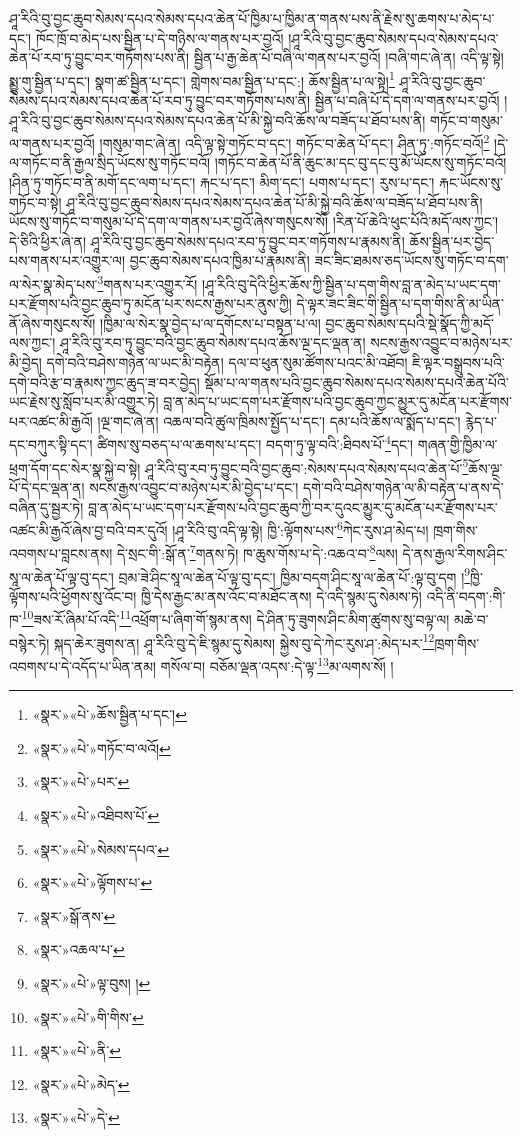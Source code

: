 ཤཱ་རིའི་བུ་བྱང་ཆུབ་སེམས་དཔའ་སེམས་དཔའ་ཆེན་པོ་ཁྱིམ་པ་ཁྱིམ་ན་གནས་པས་ནི་རྗེས་སུ་ཆགས་པ་མེད་པ་དང་། ཁོང་ཁྲོ་བ་མེད་པས་སྦྱིན་པ་དེ་གཉིས་ལ་གནས་པར་བྱའོ། །ཤཱ་རིའི་བུ་བྱང་ཆུབ་སེམས་དཔའ་སེམས་དཔའ་ཆེན་པོ་རབ་ཏུ་བྱུང་བར་གཏོགས་པས་ནི། སྦྱིན་པ་རྒྱ་ཆེན་པོ་བཞི་ལ་གནས་པར་བྱའོ། །བཞི་གང་ཞེ་ན། འདི་ལྟ་སྟེ། སྨྱུ་གུ་སྦྱིན་པ་དང་། སྣག་ཚ་སྦྱིན་པ་དང་། གླེགས་བམ་སྦྱིན་པ་དང་:། ཆོས་སྦྱིན་པ་ལ་སྟེ།\footnote{«སྣར་»«པེ་»ཆོས་སྦྱིན་པ་དང་།} ཤཱ་རིའི་བུ་བྱང་ཆུབ་སེམས་དཔའ་སེམས་དཔའ་ཆེན་པོ་རབ་ཏུ་བྱུང་བར་གཏོགས་པས་ནི། སྦྱིན་པ་བཞི་པོ་དེ་དག་ལ་གནས་པར་བྱའོ། །ཤཱ་རིའི་བུ་བྱང་ཆུབ་སེམས་དཔའ་སེམས་དཔའ་ཆེན་པོ་མི་སྐྱེ་བའི་ཆོས་ལ་བཟོད་པ་ཐོབ་པས་ནི། གཏོང་བ་གསུམ་ལ་གནས་པར་བྱའོ། །གསུམ་གང་ཞེ་ན། འདི་ལྟ་སྟེ་གཏོང་བ་དང་། གཏོང་བ་ཆེན་པོ་དང་། ཤིན་ཏུ་:གཏོང་བའོ།\footnote{«སྣར་»«པེ་»གཏོང་བ་ལའོ།} །དེ་ལ་གཏོང་བ་ནི་རྒྱལ་སྲིད་ཡོངས་སུ་གཏོང་བའོ། །གཏོང་བ་ཆེན་པོ་ནི་ཆུང་མ་དང་བུ་དང་བུ་མོ་ཡོངས་སུ་གཏོང་བའོ། །ཤིན་ཏུ་གཏོང་བ་ནི་མགོ་དང་ལག་པ་དང་། རྐང་པ་དང་། མིག་དང་། པགས་པ་དང་། རུས་པ་དང་། རྐང་ཡོངས་སུ་གཏོང་བ་སྟེ། ཤཱ་རིའི་བུ་བྱང་ཆུབ་སེམས་དཔའ་སེམས་དཔའ་ཆེན་པོ་མི་སྐྱེ་བའི་ཆོས་ལ་བཟོད་པ་ཐོབ་པས་ནི། ཡོངས་སུ་གཏོང་བ་གསུམ་པོ་དེ་དག་ལ་གནས་པར་བྱའོ་ཞེས་གསུངས་སོ། །རིན་པོ་ཆེའི་ཕུང་པོའི་མདོ་ལས་ཀྱང་། དེ་ཅིའི་ཕྱིར་ཞེ་ན། ཤཱ་རིའི་བུ་བྱང་ཆུབ་སེམས་དཔའ་རབ་ཏུ་བྱུང་བར་གཏོགས་པ་རྣམས་ནི། ཆོས་སྦྱིན་པར་བྱེད་པས་གནས་པར་འགྱུར་ལ། བྱང་ཆུབ་སེམས་དཔའ་ཁྱིམ་པ་རྣམས་ནི། ཟང་ཟིང་ཐམས་ཅད་ཡོངས་སུ་གཏོང་བ་དག་ལ་སེར་སྣ་མེད་པས་\footnote{«སྣར་»«པེ་»པར་}གནས་པར་འགྱུར་རོ། །ཤཱ་རིའི་བུ་དེའི་ཕྱིར་ཆོས་ཀྱི་སྦྱིན་པ་དག་གིས་བླ་ན་མེད་པ་ཡང་དག་པར་རྫོགས་པའི་བྱང་ཆུབ་ཏུ་མངོན་པར་སངས་རྒྱས་པར་ནུས་ཀྱི། དེ་ལྟར་ཟང་ཟིང་གི་སྦྱིན་པ་དག་གིས་ནི་མ་ཡིན་ནོ་ཞེས་གསུངས་སོ། །ཁྱིམ་ལ་སེར་སྣ་བྱེད་པ་ལ་དགོངས་པ་བསྟན་པ་ལ། བྱང་ཆུབ་སེམས་དཔའི་སྡེ་སྣོད་ཀྱི་མདོ་ལས་ཀྱང་། ཤཱ་རིའི་བུ་རབ་ཏུ་བྱུང་བའི་བྱང་ཆུབ་སེམས་དཔའ་ཆོས་ལྔ་དང་ལྡན་ན། སངས་རྒྱས་འབྱུང་བ་མཉེས་པར་མི་བྱེད། དགེ་བའི་བཤེས་གཉེན་ལ་ཡང་མི་བརྟེན། དལ་བ་ཕུན་སུམ་ཚོགས་པའང་མི་འཐོབ། ཇི་ལྟར་བསྒྲུབས་པའི་དགེ་བའི་རྩ་བ་རྣམས་ཀྱང་ཆུད་ཟ་བར་བྱེད། སྡོམ་པ་ལ་གནས་པའི་བྱང་ཆུབ་སེམས་དཔའ་སེམས་དཔའ་ཆེན་པོའི་ཡང་རྗེས་སུ་སློབ་པར་མི་འགྱུར་ཏེ། བླ་ན་མེད་པ་ཡང་དག་པར་རྫོགས་པའི་བྱང་ཆུབ་ཀྱང་མྱུར་དུ་མངོན་པར་རྫོགས་པར་འཚང་མི་རྒྱའོ། །ལྔ་གང་ཞེ་ན། འཆལ་བའི་ཚུལ་ཁྲིམས་སྤྱོད་པ་དང་། དམ་པའི་ཆོས་ལ་སྨོད་པ་དང་། རྙེད་པ་དང་བཀུར་སྟི་དང་། ཚིགས་སུ་བཅད་པ་ལ་ཆགས་པ་དང་། བདག་ཏུ་ལྟ་བའི་:ཐིབས་པོ་\footnote{«སྣར་»«པེ་»འཐིབས་པོ་}དང་། གཞན་གྱི་ཁྱིམ་ལ་ཕྲག་དོག་དང་སེར་སྣ་སྐྱེ་བ་སྟེ། ཤཱ་རིའི་བུ་རབ་ཏུ་བྱུང་བའི་བྱང་ཆུབ་:སེམས་དཔའ་སེམས་དཔའ་ཆེན་པོ་\footnote{«སྣར་»«པེ་»སེམས་དཔའ་}ཆོས་ལྔ་པོ་དེ་དང་ལྡན་ན། སངས་རྒྱས་འབྱུང་བ་མཉེས་པར་མི་བྱེད་པ་དང་། དགེ་བའི་བཤེས་གཉེན་ལ་མི་བརྟེན་པ་ནས་དེ་བཞིན་དུ་སྦྱར་ཏེ། བླ་ན་མེད་པ་ཡང་དག་པར་རྫོགས་པའི་བྱང་ཆུབ་ཀྱི་བར་དུའང་མྱུར་དུ་མངོན་པར་རྫོགས་པར་འཚང་མི་རྒྱའོ་ཞེས་བྱ་བའི་བར་དུའོ། །ཤཱ་རིའི་བུ་འདི་ལྟ་སྟེ། ཁྱི་:ལྟོགས་པས་\footnote{«སྣར་»«པེ་»ལྟོགས་པ་}ཀེང་རུས་ཤ་མེད་པ། ཁྲག་གིས་འབགས་པ་བླངས་ནས། དེ་སྲང་གི་:སྒོ་ན་\footnote{«སྣར་»སྒོ་ནས་}གནས་ཏེ། ཁ་ཆུས་གོས་པ་དེ་:འཆའ་བ་\footnote{«སྣར་»འཆལ་པ་}ལས། དེ་ནས་རྒྱལ་རིགས་ཤིང་སཱ་ལ་ཆེན་པོ་ལྟ་བུ་དང་། བྲམ་ཟེ་ཤིང་སཱ་ལ་ཆེན་པོ་ལྟ་བུ་དང་། ཁྱིམ་བདག་ཤིང་སཱ་ལ་ཆེན་པོ་:ལྟ་བུ་དག །\footnote{«སྣར་»«པེ་»ལྟ་བུས། །}ཁྱི་ལྟོགས་པའི་ཕྱོགས་སུ་འོང་བ། ཁྱི་དེས་རྒྱང་མ་ནས་འོང་བ་མཐོང་ནས། དེ་འདི་སྙམ་དུ་སེམས་ཏེ། འདི་ནི་བདག་:གི་ཁ་\footnote{«སྣར་»«པེ་»གི་གིས་}ཟས་རོ་ཞིམ་པོ་འདི་\footnote{«སྣར་»«པེ་»ནི་}འཕྲོག་པ་ཞིག་གོ་སྙམ་ནས། དེ་ཤིན་ཏུ་ཟུགས་ཤིང་མིག་ཚུགས་སུ་བལྟ་ལ། མཆེ་བ་བསྙེར་ཏེ། སྐད་ཆེར་ཟུགས་ན། ཤཱ་རིའི་བུ་དེ་ཇི་སྙམ་དུ་སེམས། སྐྱེས་བུ་དེ་ཀེང་རུས་ཤ་:མེད་པར་\footnote{«སྣར་»«པེ་»མེད་}ཁྲག་གིས་འབགས་པ་དེ་འདོད་པ་ཡིན་ནམ། གསོལ་བ། བཅོམ་ལྡན་འདས་:དེ་ལྟ་\footnote{«སྣར་»«པེ་»དེ་}མ་ལགས་སོ། །
